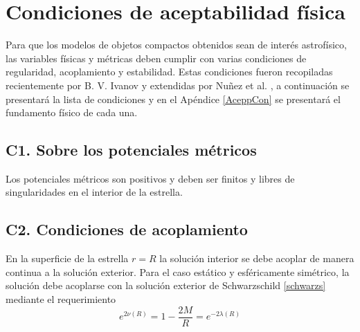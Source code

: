 




\section{Condiciones de aceptabilidad física}\label{phyacep}
\noindent Para que los modelos de objetos compactos obtenidos sean de interés astrofísico, las variables físicas y métricas deben cumplir con varias condiciones de regularidad, acoplamiento y estabilidad. Estas condiciones fueron recopiladas recientemente por B. V. Ivanov \cite{Ivanov2017} y extendidas por Nuñez et al. \cite{Hernandez2018}, a continuación se presentará la lista de condiciones y en el Apéndice \ref{AceppCon} se presentará el fundamento físico de cada una.

\subsection*{C1. Sobre los potenciales métricos}
\noindent Los potenciales métricos son positivos y deben ser finitos y libres de singularidades en el interior de la estrella. 

\subsection*{C2. Condiciones de acoplamiento}
\noindent En la superficie de la estrella $r=R$ la solución interior se debe acoplar de manera continua a la solución exterior. Para el caso estático y esféricamente simétrico, la solución debe acoplarse con la solución exterior de Schwarzschild \eqref{schwarzs} mediante el requerimiento
\begin{equation}
      e ^ {  2 \nu(R) } =  1 - \frac { 2 M } { R } = e ^ { -2 \lambda(R) } 
\end{equation}

